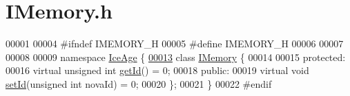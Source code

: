\hypertarget{IMemory_8h_source}{}\section{I\+Memory.\+h}
\label{IMemory_8h_source}

\begin{DoxyCode}
00001 
00004 \textcolor{preprocessor}{#ifndef IMEMORY\_H}
00005 \textcolor{preprocessor}{#define IMEMORY\_H}
00006 
00007 
00008 
00009 \textcolor{keyword}{namespace }\hyperlink{namespaceIceAge}{IceAge} \{
\hypertarget{IMemory_8h_source.tex_l00013}{}\hyperlink{classIceAge_1_1IMemory}{00013}     \textcolor{keyword}{class }\hyperlink{classIceAge_1_1IMemory}{IMemory} \{
00014 
00015     \textcolor{keyword}{protected}:
00016         \textcolor{keyword}{virtual} \textcolor{keywordtype}{unsigned} \textcolor{keywordtype}{int} \hyperlink{classIceAge_1_1IMemory_a6daed1a6ad4faf52393d6437866bf330}{getId}() = 0; 
00018     \textcolor{keyword}{public}:
00019         \textcolor{keyword}{virtual} \textcolor{keywordtype}{void} \hyperlink{classIceAge_1_1IMemory_ab1e3adeca064926cd54773d50e5b508f}{setId}(\textcolor{keywordtype}{unsigned} \textcolor{keywordtype}{int} novaId) = 0; 
00020     \};
00021 \}
00022 \textcolor{preprocessor}{#endif}
\end{DoxyCode}
